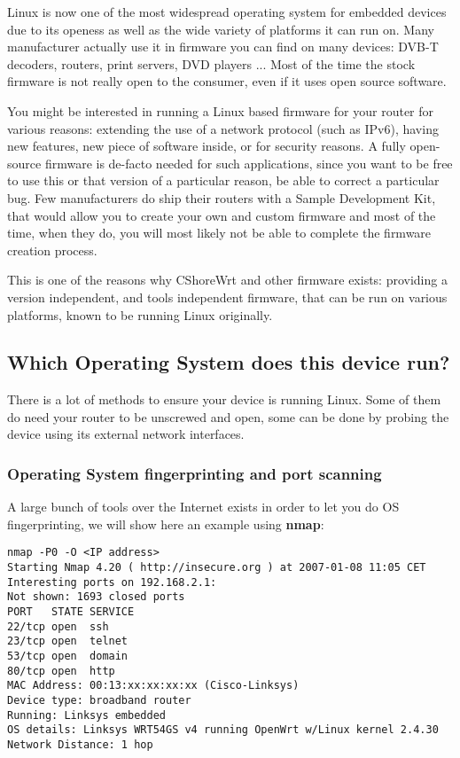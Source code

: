 Linux is now one of the most widespread operating system for embedded devices due
to its openess as well as the wide variety of platforms it can run on. Many
manufacturer actually use it in firmware you can find on many devices: DVB-T 
decoders, routers, print servers, DVD players ... Most of the time the stock 
firmware is not really open to the consumer, even if it uses open source software.

You might be interested in running a Linux based firmware for your router for
various reasons: extending the use of a network protocol (such as IPv6), having
new features, new piece of software inside, or for security reasons. A fully 
open-source firmware is de-facto needed for such applications, since you want to
be free to use this or that version of a particular reason, be able to correct a
particular bug. Few manufacturers do ship their routers with a Sample Development Kit,
that would allow you to create your own and custom firmware and most of the time,
when they do, you will most likely not be able to complete the firmware creation process.

This is one of the reasons why CShoreWrt and other firmware exists: providing a 
version independent, and tools independent firmware, that can be run on various 
platforms, known to be running Linux originally.

\subsection{Which Operating System does this device run?}

There is a lot of methods to ensure your device is running Linux. Some of them do
need your router to be unscrewed and open, some can be done by probing the device
using its external network interfaces.

\subsubsection{Operating System fingerprinting and port scanning}

A large bunch of tools over the Internet exists in order to let you do OS 
fingerprinting, we will show here an example using \textbf{nmap}:

\begin{Verbatim}
nmap -P0 -O <IP address>
Starting Nmap 4.20 ( http://insecure.org ) at 2007-01-08 11:05 CET
Interesting ports on 192.168.2.1:
Not shown: 1693 closed ports
PORT   STATE SERVICE
22/tcp open  ssh
23/tcp open  telnet
53/tcp open  domain
80/tcp open  http
MAC Address: 00:13:xx:xx:xx:xx (Cisco-Linksys)
Device type: broadband router
Running: Linksys embedded
OS details: Linksys WRT54GS v4 running OpenWrt w/Linux kernel 2.4.30
Network Distance: 1 hop
\end{Verbatim}

